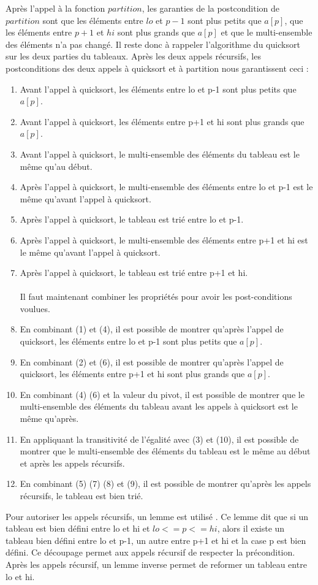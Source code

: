 \documentclass[11pt,openany]{article}
\begin{document}
		Apr\`es l'appel \`a la fonction $partition$, les garanties de la postcondition de $partition$ sont que les \'el\'ements entre $lo$ et $p-1$ sont plus petits que $a[p]$, que les \'el\'ements entre $p+1$ et $hi$ sont plus grands que $a[p]$ et que le multi-ensemble des \'el\'ements n'a pas chang\'e. Il reste donc \`a rappeler l'algorithme du quicksort sur les deux parties du tableaux. Apr\`es les deux appels r\'ecursifs, les postconditions des deux appels \`a quicksort et \`a partition nous garantissent ceci :
		\begin{enumerate}
			\item Avant l'appel \`a quicksort, les \'el\'ements entre lo et p-1 sont plus petits que $a[p]$.
			\item Avant l'appel \`a quicksort, les \'el\'ements entre p+1 et hi sont plus grands que $a[p]$.
			\item Avant l'appel \`a quicksort, le multi-ensemble des \'el\'ements du tableau est le m\^eme qu'au d\'ebut.
			\item Apr\`es l'appel \`a quicksort, le multi-ensemble des \'el\'ements entre lo et p-1 est le m\^eme qu'avant l'appel \`a quicksort.
			\item Apr\`es l'appel \`a quicksort, le tableau est tri\'e entre lo et p-1.
			\item Apr\`es l'appel \`a quicksort, le multi-ensemble des \'el\'ements entre p+1 et hi est le m\^eme qu'avant l'appel \`a quicksort.
			\item Apr\`es l'appel \`a quicksort, le tableau est tri\'e entre p+1 et hi.\\ \\
			Il faut maintenant combiner les propri\'et\'es pour avoir les post-conditions voulues.
			\item En combinant (1) et (4), il est possible de montrer qu'apr\`es l'appel de quicksort, les \'el\'ements entre lo et p-1 sont plus petits que $a[p]$.
			\item En combinant (2) et (6), il est possible de montrer qu'apr\`es l'appel de quicksort, les \'el\'ements entre p+1 et hi sont plus grands que $a[p]$.
			\item En combinant (4) (6) et la valeur du pivot, il est possible de montrer que le multi-ensemble des \'el\'ements du tableau avant les appels \`a quicksort est le m\^eme qu'apr\`es.
			\item En appliquant la transitivit\'e de l'\'egalit\'e avec (3) et (10), il est possible de montrer que le multi-ensemble des \'el\'ements du tableau est le m\^eme au d\'ebut et apr\`es les appels r\'ecursifs.
			\item En combinant (5) (7) (8) et (9), il est possible de montrer qu'apr\`es les appels r\'ecursifs, le tableau est bien tri\'e.
		\end{enumerate}
		Pour autoriser les appels r\'ecursifs, un lemme est utilis\'e . Ce lemme dit que si un tableau est bien d\'efini entre lo et hi et $lo <= p<=hi$, alors il existe un tableau bien d\'efini entre lo et p-1, un autre entre p+1 et hi et la case p est bien d\'efini. Ce d\'ecoupage permet aux appels r\'ecursif de respecter la pr\'econdition. Apr\`es les appels r\'ecursif, un lemme inverse permet de reformer un tableau entre lo et hi.
		
\end{document}
